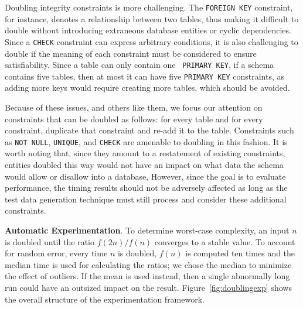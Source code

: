 

  Doubling integrity constraints is more challenging.  The {\tt FOREIGN KEY} constraint, for instance, denotes a relationship
  between two tables, thus making it difficult to double without introducing extraneous database entities or cyclic
  dependencies.  Since a {\tt CHECK} constraint can express arbitrary conditions, it is also challenging to double if the
  meaning of each constraint must be considered to ensure satisfiability.  Since a table can only contain one {\tt
  PRIMARY KEY}, if a schema contains five tables, then at most it can have five {\tt PRIMARY KEY} constraints, as adding more
  keys would require creating more tables, which should be avoided.




  Because of these issues, and others like them, we focus our attention on constraints that can be doubled as follows:
  for every table and for every constraint, duplicate that constraint and re-add it to the table.  Constraints such as
  {\tt NOT NULL}, {\tt UNIQUE}, and {\tt CHECK} are amenable to doubling in this fashion.  It is worth noting that,
  since they amount to a restatement of existing constraints, entities doubled this way would not have an impact on
  what data the schema would allow or disallow into a database, However, since the goal is to evaluate performance, the
  timing results should not be adversely affected as long as the test data generation technique must still process and consider these
  additional constraints.

  \textbf{Automatic Experimentation}. To determine worst-case complexity, an input $n$ is doubled until the ratio $f(2n)
  / f(n)$ converges to a stable value.  To account for random error, every time $n$ is doubled, $f(n)$ is computed ten
  times and the median time is used for calculating the ratios; we chose the median to minimize the effect of outliers.
  If the mean is used instead, then a single abnormally long run could have an outsized impact on the result.
  Figure~\ref{fig:doublingexp} shows the overall structure of the experimentation framework.

